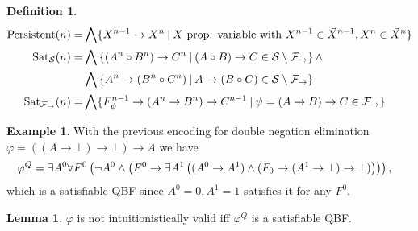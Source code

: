 \documentclass[a4paper,12pt]{report}
\theoremstyle{definition}
\theoremstyle{definition}
\theoremstyle{definition}
\newtheorem{lemma}[theorem]{Lemma}
\theoremstyle{definition}
\theoremstyle{definition}
\newtheorem{definition}[theorem]{Definition}
\theoremstyle{definition}
\newtheorem{example}[theorem]{Example}
\theoremstyle{definition}
\begin{document}
\begin{definition}
\begin{align*}
			\text{\normalfont Persistent}(n) = & \bigwedge\{X^{n-1}\to X^n\:|\: X \text{ prop. variable with }X^{n-1}\in\vec X^{n-1}, X^n \in\vec X^{n}\}\\
			\text{\normalfont Sat}_{\mathcal S}(n) = &\bigwedge\left\{(A^n\circ B^n)\to C^n\:|\:(A\circ B)\to C\in \mathcal S\setminus\mathcal F_\to\right\}\wedge\\
			&\bigwedge\left\{A^n\to (B^n\circ C^n)\:|\:A\to (B\circ C)\in \mathcal S\setminus\mathcal F_\to\right\}\\
			\text{\normalfont Sat}_{\mathcal F_\to}(n) = & \bigwedge\{F^{n-1}_\psi\to (A^n\to B^n)\to C^{n-1}\:|\:\psi = (A\to B)\to C\in\mathcal F_\to\}
		\end{align*}
	\end{definition}
	
	\begin{example}
		With the previous encoding for double negation elimination $\varphi = ((A\to \bot)\to \bot)\to A$ we have
		$$\hspace*{-.3cm}
		\varphi^Q = \exists A^0\forall F^0\left(\neg A^0\wedge\left(F^0\to \exists A^1\left((A^0\to A^1)\wedge(F_0\to (A^1\to \bot)\to \bot)\right)\right)\right),
		$$
		which is a satisfiable QBF since $A^0 = 0, A^1 = 1$ satisfies it for any $F^0$.
	\end{example}
	
	
	\begin{lemma}
		$\varphi$ is not intuitionistically valid iff $\varphi^Q$ is a satisfiable QBF.
	\end{lemma}
	
\end{document}
